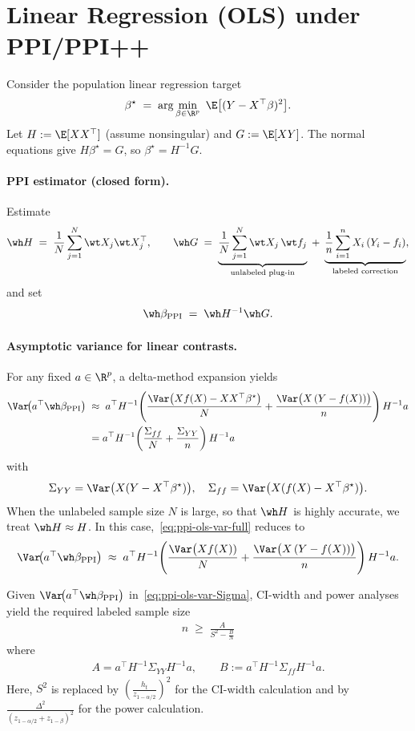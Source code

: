 \section{Linear Regression (OLS) under PPI/PPI++}
\label{sec:OLS}
Consider the population linear regression target
\[
\beta^\star \;=\; \arg\min_{\beta\in\R^p}\ \E\big[(Y-X^\top\beta)^2\big].
\]
Let $H:=\E[XX^\top]$ (assume nonsingular) and $G:=\E[XY]$. The normal equations give $H\beta^\star=G$, so $\beta^\star=H^{-1}G$.

\paragraph{PPI estimator (closed form).}
Estimate
\[
\wh H \;=\; \frac{1}{N}\sum_{j=1}^N \wt X_j \wt X_j^\top,\qquad
\wh G \;=\; \underbrace{\frac{1}{N}\sum_{j=1}^N \wt X_j\,\wt f_j}_{\text{unlabeled plug-in}}
\;+\;
\underbrace{\frac{1}{n}\sum_{i=1}^n X_i\,(Y_i-f_i)}_{\text{labeled correction}},
\]
and set
\begin{equation}\label{eq:ppi-ols}
\wh\beta_{\mathrm{PPI}} \;=\; \wh H^{-1}\wh G.
\end{equation}

\paragraph{Asymptotic variance for linear contrasts.}
For any fixed $a\in\R^p$, a delta-method expansion yields
\begin{align}
\label{eq:ppi-ols-var-full}
\Var\!\big(a^\top\wh\beta_{\mathrm{PPI}}\big)
\;&\approx\;
a^\top H^{-1}\!\left(
\frac{\Var\big(X f(X)-XX^\top\beta^\star\big)}{N}
+
\frac{\Var\big(X\,(Y-f(X))\big)}{n}
\right)H^{-1}a\\
&=
\label{eq:ppi-ols-var-Sigma}
a^\top H^{-1}\!\left(
\frac{\Sigma_{ff}}{N}
+
\frac{\Sigma_{YY}}{n}
\right)H^{-1}a
\end{align}
with
\[
\Sigma_{YY}=\Var\big(X(Y-X^\top\beta^\star)\big),\quad
\Sigma_{ff}=\Var\big(X(f(X)-X^\top\beta^\star)\big).\]
When the unlabeled sample size $N$ is large, so that $\wh H$ is highly accurate, we treat $\wh H\approx H$. In this case,~\eqref{eq:ppi-ols-var-full} reduces to\begin{equation}
\label{eq:ppi-ols-var-reduc}
\Var\!\big(a^\top\wh\beta_{\mathrm{PPI}}\big)
\;\approx\;
a^\top H^{-1}\!\left(
\frac{\Var\big(X f(X))}{N}
+
\frac{\Var\big(X\,(Y-f(X))\big)}{n}
\right)H^{-1}a.
\end{equation}

\noindent
Given $\Var\!\big(a^\top\wh\beta_{\mathrm{PPI}}\big)$ in~\eqref{eq:ppi-ols-var-Sigma}, CI-width and power analyses yield the required labeled sample size\begin{align}
\label{eq:n-for-ols-ppi}
    n\;\geq\;\frac{A}{S^2-\frac{B}{N}}
\end{align}where
\begin{align*}
A=a^\top H^{-1}\Sigma_{YY}H^{-1}a,\qquad
B:=a^\top H^{-1}\Sigma_{ff}H^{-1}a.\end{align*}Here, $S^2$ is replaced by $\left(\frac{h_t}{z_{1-\alpha/2}}\right)^2$ for the CI-width calculation and by $\frac{\Delta^2}{(z_{1-\alpha/2}+z_{1-\beta})^2}$ for the power calculation.


